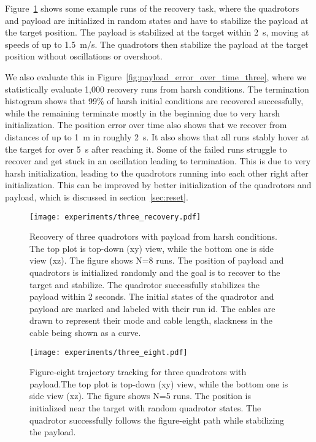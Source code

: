 Figure~\ref{fig:three_recovery} shows some example runs of the recovery task, where the quadrotors and payload are initialized in random states and have to stabilize the payload at the target position. The payload is stabilized at the target within 2~s, moving at speeds of up to 1.5~m/s. The quadrotors then stabilize the payload at the target position without oscillations or overshoot.

We also evaluate this in Figure~\ref{fig:payload_error_over_time_three}, where we statistically evaluate 1,000 recovery runs from harsh conditions. The termination histogram shows that 99\% of harsh initial conditions are recovered successfully, while the remaining terminate mostly in the beginning due to very harsh initialization. The position error over time also shows that we recover from distances of up to 1~m in roughly 2~s. It also shows that all runs stably hover at the target for over 5~s after reaching it. Some of the failed runs struggle to recover and get stuck in an oscillation leading to termination. This is due to very harsh initialization, leading to the quadrotors running into each other right after initialization. This can be improved by better initialization of the quadrotors and payload, which is discussed in section~\ref{sec:reset}.

\begin{figure}[H]
    \centering
    
    \texttt{[image: experiments/three\_recovery.pdf]}
    \caption[Three quadrotor harsh recovery trajectory]{Recovery of three quadrotors with payload from harsh conditions. The top plot is top-down  (xy) view, while the bottom one is side view (xz).
    The figure shows N=8 runs. The position of payload and quadrotors is initialized randomly and the goal is to recover to the target and stabilize. The quadrotor successfully stabilizes the payload within 2 seconds. The initial states of the quadrotor and payload are marked and labeled with their run id. The cables are drawn to represent their mode and cable length, slackness in the cable being shown as a curve.}
    \label{fig:three_recovery}
\end{figure}
\begin{figure}[H]
    \centering
    
    \texttt{[image: experiments/three\_eight.pdf]}
    \caption[Three quadrotor figure-eight tracking]{Figure-eight trajectory tracking for three quadrotors with payload.The top plot is top-down  (xy) view, while the bottom one is side view (xz). The figure shows N=5 runs. The position is initialized near the target with random quadrotor states. The quadrotor successfully follows the figure-eight path while stabilizing the payload.}
    \label{fig:three_eight}
\end{figure}


